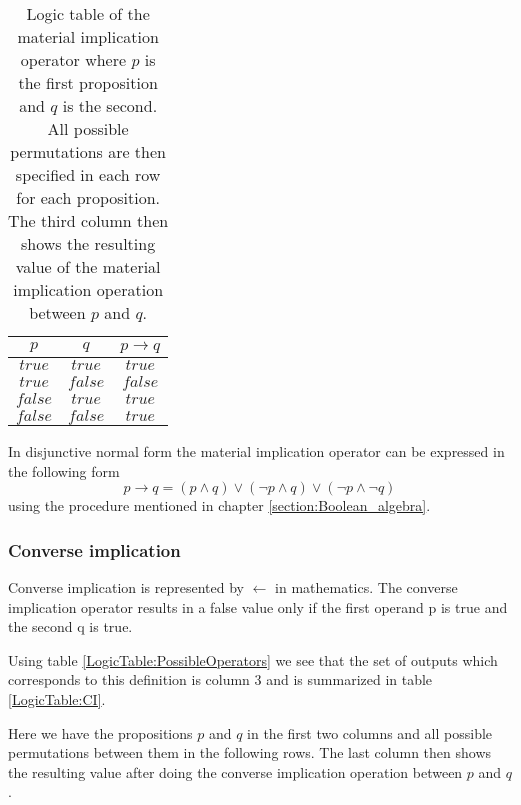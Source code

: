         \begin{table}[h!]
            \centering
            \begin{tabular}{|c|c|c|}
            	\hline
            	  $p$   &   $q$   & $p \rightarrow q$ \\ \hline
            	$true$  & $true$  &      $true$       \\ \hline
            	$true$  & $false$ &      $false$      \\ \hline
            	$false$ & $true$  &      $true$       \\ \hline
            	$false$ & $false$ &      $true$       \\ \hline
            \end{tabular}
            \caption{Logic table of the material implication operator where $p$ is the first proposition and $q$ is the second. All possible permutations are then specified in each row for each proposition. The third column then shows the resulting value of the material implication operation between $p$ and $q$.}
            \label{LogicTable:MI}
        \end{table}
        
        In disjunctive normal form the material implication operator can be expressed in the following form
        \begin{equation}
            p \rightarrow q = (p \wedge  q) \vee (\neg p \wedge q) \vee (\neg p \wedge \neg q)
        \end{equation}
        using the procedure mentioned in chapter \ref{section:Boolean_algebra}.
    
    
    \subsubsection{Converse implication}
        Converse implication is represented by $\leftarrow$ in mathematics. The converse implication operator results in a false value only if the first operand p is true and the second q is true.
        
        Using table \ref{LogicTable:PossibleOperators} we see that the set of outputs which corresponds to this definition is column 3 and is summarized in table \ref{LogicTable:CI}.
        
        Here we have the propositions $p$ and $q$ in the first two columns and all possible permutations between them in the following rows. The last column then shows the resulting value after doing the converse implication operation between $p$ and $q$.
        
